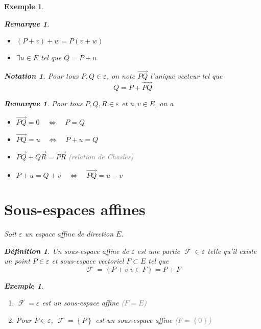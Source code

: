 \documentclass[a4paper, oneside]{report}
\theoremstyle{break}
\newtheorem{definition}[thm]{Définition}
\newtheorem{notation}[thm]{Notation}
\newtheorem{exemple}[thm]{Exemple}
\newtheorem{remarque}[thm]{Remarque}
\newcommand{\gray}[1]{\textcolor{gray}{#1}}
\DeclareMathOperator{\F}{\mathcal{F}}
\DeclarePairedDelimiter\ens{\left\{ }{\right\} }%
\renewcommand{\ens}[1]{\left\{ #1 \right\} }%
\newcommand{\Ens}{\ens}
\newcommand{\ensF}{\F}
\begin{document}
\begin{exemple}
\begin{remarque}
\begin{itemize}[label=$\bullet$]
\item $(P + v) + w = P (v + w)$

\item $\exists u \in E$ tel que $Q = P + u$
\end{itemize}
\end{remarque}

\begin{notation}
Pour tous $P, Q \in \varepsilon$, on note $\vec{PQ}$ l'unique vecteur tel que
\[
Q = P + \vec{PQ}
\]
\end{notation}

\begin{remarque}
Pour tous $P, Q, R \in \varepsilon$ et $u, v \in E$, on a
\begin{itemize}[label=$\bullet$]
\item $\vec{PQ} = 0		\quad	\Leftrightarrow	\quad		P = Q$

\item $\vec{PQ} = u		\quad	\Leftrightarrow	\quad		P + u = Q$

\item $\vec{PQ} + \vec{QR} = \vec{PR}$
\newline
\gray{(relation de Chasles)}

\item $P + u = Q + v		\quad	\Leftrightarrow	\quad		\vec{PQ} = u - v$
\end{itemize}
\end{remarque}

\section{Sous-espaces affines}

Soit $\varepsilon$ un espace affine de direction $E$.

\begin{definition}
Un sous-espace affine de $\varepsilon$ est une partie $\ensF \in \varepsilon$ telle qu'il existe un point $P \in \varepsilon$ et sous-espace vectoriel $F \subset E$ tel que
\[
\ensF = \Ens{P + v \big| v \in F} = P + F
\]
\end{definition}

\begin{exemple}
\begin{enumerate}
\item  $\ensF = \varepsilon$ est un sous-espace affine \gray{($F = E$)}

\medbreak

\item  Pour $P \in \varepsilon$, $\ensF = \ens{P}$ est un sous-espace affine \gray{($F = \ens{0}$)}
\end{enumerate}
\end{exemple}


\end{exemple}
\end{document}
